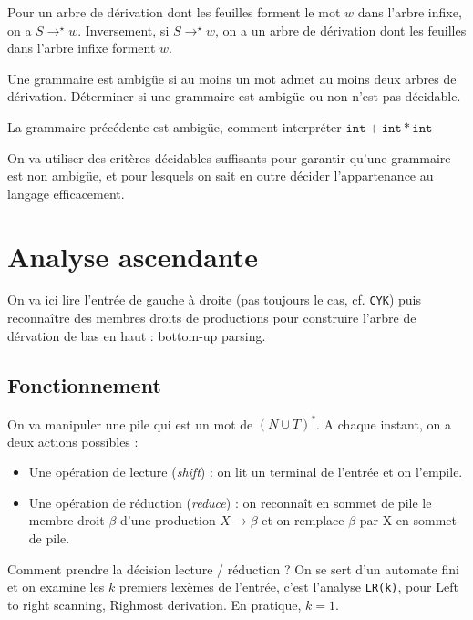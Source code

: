 \documentclass{cours}
\begin{document}
Pour un arbre de dérivation dont les feuilles forment le mot $w$ dans l'arbre infixe, on a $S \rightarrow^{\star} w$. Inversement, si $S \rightarrow^{\star} w$, on a un arbre de dérivation dont les feuilles dans l'arbre infixe forment $w$.

\begin{definition}
    Une grammaire est ambigüe si au moins un mot admet au moins deux arbres de dérivation. Déterminer si une grammaire est ambigüe ou non n'est pas décidable.
\end{definition}
La grammaire précédente est ambigüe, comment interpréter $\texttt{int} + \texttt{int} * \texttt{int}$

On va utiliser des critères décidables suffisants pour garantir qu'une grammaire est non ambigüe, et pour lesquels on sait en outre décider l'appartenance au langage efficacement.

\section{Analyse ascendante}
On va ici lire l'entrée de gauche à droite (pas toujours le cas, cf. \texttt{CYK}) puis reconnaître des membres droits de productions pour construire l'arbre de dérvation de bas en haut : bottom-up parsing.

\subsection{Fonctionnement}
On va manipuler une pile qui est un mot de $(N \cup T)^{*}$.
A chaque instant, on a deux actions possibles :
\begin{itemize}
    \item Une opération de lecture (\textit{shift}) : on lit un terminal de l'entrée et on l'empile.
    \item Une opération de réduction (\textit{reduce}) : on reconnaît en sommet de pile le membre droit $\beta$ d'une production $X \rightarrow \beta$ et on remplace $\beta$ par X en sommet de pile.
\end{itemize}
Comment prendre la décision lecture / réduction ? On se sert d'un automate fini et on examine les $k$ premiers lexèmes de l'entrée, c'est l'analyse \texttt{LR(k)}, pour \og Left to right scanning, Righmost derivation\fg. En pratique, $k = 1$.
\end{document}
